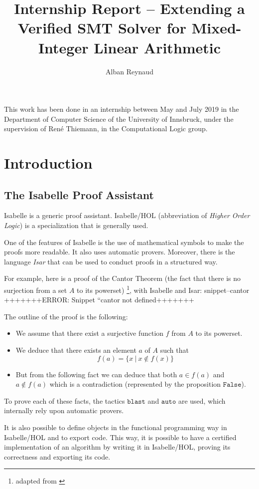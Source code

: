 \documentclass{article}
\title{Internship Report -- Extending a Verified SMT Solver for Mixed-Integer
Linear Arithmetic}
\author{Alban Reynaud}
\date{}
\newcommand{\Snippet}[1]{%
  \ifcsname snippet--#1\endcsname{\csname snippet--#1\endcsname}%
  \else+++++++ERROR: Snippet ``#1 not defined+++++++ \fi}
\begin{document}
\maketitle

This work has been done in an internship between May and July 2019
in the Department of Computer Science
of the University of Innsbruck, under the supervision of René Thiemann, in the
Computational Logic group.

\tableofcontents

\section{Introduction}
\subsection{The Isabelle Proof Assistant}
Isabelle \cite{Isabelle} is a generic proof assistant. Isabelle/HOL
(abbreviation of \textit{Higher Order Logic}) is a specialization that is
generally used.

One of the features of Isabelle is the use of mathematical symbols to make the
proofs more readable. It also uses automatic provers.
Moreover, there is the language \textit{Isar} that can be used to conduct proofs
in a structured way.

For example, here is a proof of the Cantor Theorem (the fact that there is no
surjection from a set $A$ to its powerset)
\footnote{adapted from \cite[Section 5.1]{ConcreteSemantics}},
with Isabelle and Isar:
\Snippet{cantor}

The outline of the proof is the following:
\begin{itemize}
  \item We assume that there exist a surjective function $f$ from $A$ to
    its powerset.
  \item We deduce that there exists an element $a$ of $A$ such that
    $$f(a) = \{x~|~x \notin f(x)\}$$
  \item But from the following fact we can deduce that both $a \in f(a)$ and $a
    \notin f(a)$ which is a contradiction (represented by the proposition
    $\mathtt{False}$).
\end{itemize}
To prove each of these facts, the tactics $\mathtt{blast}$ and
$\mathtt{auto}$ are used, which internally rely upon automatic provers.

It is also possible to define objects in the functional programming way in
Isabelle/HOL and to export code. This way, it is possible to have a certified
implementation of an algorithm by writing it in Isabelle/HOL, proving its
correctness and exporting its code.
\end{document}
